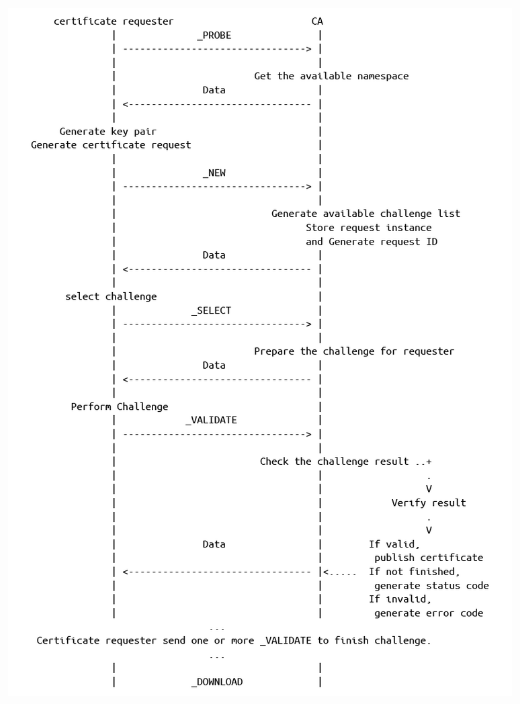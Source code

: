 \documentclass[a0,portrait]{poster}
\begin{document}
\begin{multicols}{2}
\begin{minipage}[b]{0.57\linewidth}
	\includegraphics[width=\linewidth]{figures/protocol.png}
\end{minipage}
\begin{minipage}[b]{0.43\linewidth}
	\centering

\end{minipage}
\end{multicols}
\end{document}
